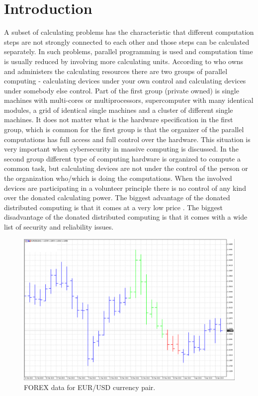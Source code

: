 \documentclass[graybox]{svmult}
\begin{document}
\section{Introduction}
\label{sec:01}

A subset of calculating problems has the characteristic that different computation steps are not strongly connected to each other and those steps can be calculated separately. In such problems, parallel programming is used and computation time is usually reduced by involving more calculating units. According to who owns and administers the calculating resources there are two groups of parallel computing - calculating devices under your own control and calculating devices under somebody else control. Part of the first group (private owned) is single machines with multi-cores or multiprocessors, supercomputer with many identical modules, a grid  \cite{g-stock-01} of identical single machines and a cluster of different single machines. It does not matter what is the hardware specification in the first group, which is common for the first group is that the organizer of the parallel computations has full access and full control over the hardware. This situation is very important when cybersecurity in massive computing is discussed. In the second group different type of computing hardware is organized to compute a common task, but calculating devices are not under the control of the person or the organization who/which is doing the computations. When the involved devices are participating in a volunteer principle there is no control of any kind over the donated calculating power. The biggest advantage of the donated distributed computing is that it comes at a very low price \cite{mql5-cloud-network-01}. The biggest disadvantage of the donated distributed computing is that it comes with a wide list of security and reliability issues. 

\begin{figure}[b]
\sidecaption
\includegraphics[width=\textwidth,height=0.5\textwidth]{fig01}
\caption{FOREX data for EUR/USD currency pair.}
\label{fig:01}
\end{figure}
\end{document}
